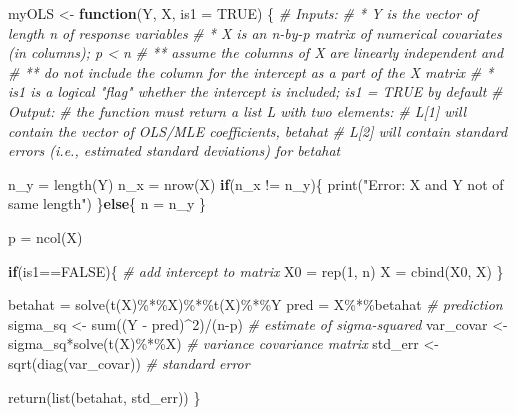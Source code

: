 \documentclass[
  11pt,
]{article}
\newenvironment{Shaded}{\begin{snugshade}}{\end{snugshade}}
\newcommand{\AttributeTok}[1]{\textcolor[rgb]{0.77,0.63,0.00}{#1}}
\newcommand{\CommentTok}[1]{\textcolor[rgb]{0.56,0.35,0.01}{\textit{#1}}}
\newcommand{\ConstantTok}[1]{\textcolor[rgb]{0.00,0.00,0.00}{#1}}
\newcommand{\ControlFlowTok}[1]{\textcolor[rgb]{0.13,0.29,0.53}{\textbf{#1}}}
\newcommand{\DecValTok}[1]{\textcolor[rgb]{0.00,0.00,0.81}{#1}}
\newcommand{\FunctionTok}[1]{\textcolor[rgb]{0.00,0.00,0.00}{#1}}
\newcommand{\NormalTok}[1]{#1}
\newcommand{\OtherTok}[1]{\textcolor[rgb]{0.56,0.35,0.01}{#1}}
\newcommand{\SpecialCharTok}[1]{\textcolor[rgb]{0.00,0.00,0.00}{#1}}
\newcommand{\StringTok}[1]{\textcolor[rgb]{0.31,0.60,0.02}{#1}}
\begin{document}
\begin{Shaded}
\begin{Highlighting}[]
\NormalTok{myOLS }\OtherTok{\textless{}{-}} \ControlFlowTok{function}\NormalTok{(Y, X, }\AttributeTok{is1 =} \ConstantTok{TRUE}\NormalTok{) \{}
\CommentTok{\# Inputs:}
\CommentTok{\# * Y is the vector of length n of response variables}
\CommentTok{\# * X is an n{-}by{-}p matrix of numerical covariates (in columns); p \textless{} n}
\CommentTok{\# ** assume the columns of X are linearly independent and}
\CommentTok{\# ** do not include the column for the intercept as a part of the X matrix}
\CommentTok{\# * is1 is a logical "flag" whether the intercept is included; is1 = TRUE by default}
\CommentTok{\# Output:}
\CommentTok{\# the function must return a list L with two elements:}
\CommentTok{\# L[1] will contain the vector of OLS/MLE coefficients, betahat}
\CommentTok{\# L[2] will contain standard errors (i.e., estimated standard deviations) for betahat}

\NormalTok{  n\_y }\OtherTok{=} \FunctionTok{length}\NormalTok{(Y)}
\NormalTok{  n\_x }\OtherTok{=} \FunctionTok{nrow}\NormalTok{(X)}
  \ControlFlowTok{if}\NormalTok{(n\_x }\SpecialCharTok{!=}\NormalTok{ n\_y)\{}
    \FunctionTok{print}\NormalTok{(}\StringTok{"Error: X and Y not of same length"}\NormalTok{)}
\NormalTok{  \}}\ControlFlowTok{else}\NormalTok{\{}
\NormalTok{    n }\OtherTok{=}\NormalTok{ n\_y}
\NormalTok{  \}}
  
\NormalTok{  p }\OtherTok{=} \FunctionTok{ncol}\NormalTok{(X)}
  
  \ControlFlowTok{if}\NormalTok{(is1}\SpecialCharTok{==}\ConstantTok{FALSE}\NormalTok{)\{}
    \CommentTok{\# add intercept to matrix}
\NormalTok{    X0 }\OtherTok{=} \FunctionTok{rep}\NormalTok{(}\DecValTok{1}\NormalTok{, n)}
\NormalTok{    X }\OtherTok{=} \FunctionTok{cbind}\NormalTok{(X0, X)}
\NormalTok{  \}}
  
\NormalTok{  betahat }\OtherTok{=} \FunctionTok{solve}\NormalTok{(}\FunctionTok{t}\NormalTok{(X)}\SpecialCharTok{\%*\%}\NormalTok{X)}\SpecialCharTok{\%*\%}\FunctionTok{t}\NormalTok{(X)}\SpecialCharTok{\%*\%}\NormalTok{Y}
\NormalTok{  pred }\OtherTok{=}\NormalTok{ X}\SpecialCharTok{\%*\%}\NormalTok{betahat }\CommentTok{\# prediction}
\NormalTok{  sigma\_sq }\OtherTok{\textless{}{-}} \FunctionTok{sum}\NormalTok{((Y }\SpecialCharTok{{-}}\NormalTok{ pred)}\SpecialCharTok{\^{}}\DecValTok{2}\NormalTok{)}\SpecialCharTok{/}\NormalTok{(n}\SpecialCharTok{{-}}\NormalTok{p)  }\CommentTok{\# estimate of sigma{-}squared}
\NormalTok{  var\_covar }\OtherTok{\textless{}{-}}\NormalTok{ sigma\_sq}\SpecialCharTok{*}\FunctionTok{solve}\NormalTok{(}\FunctionTok{t}\NormalTok{(X)}\SpecialCharTok{\%*\%}\NormalTok{X) }\CommentTok{\# variance covariance matrix}
\NormalTok{  std\_err }\OtherTok{\textless{}{-}} \FunctionTok{sqrt}\NormalTok{(}\FunctionTok{diag}\NormalTok{(var\_covar)) }\CommentTok{\# standard error}
  
  \FunctionTok{return}\NormalTok{(}\FunctionTok{list}\NormalTok{(betahat, std\_err))}
\NormalTok{\}}
\end{Highlighting}
\end{Shaded}
\end{document}
